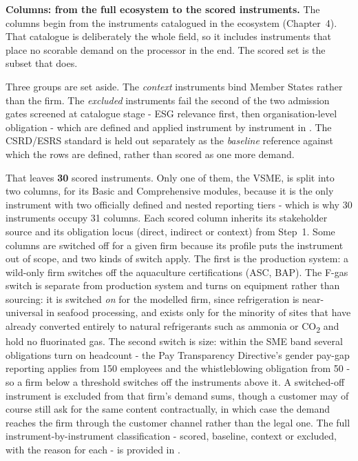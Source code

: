 \textbf{Columns: from the full ecosystem to the scored instruments.} The columns
begin from the instruments catalogued in the ecosystem (Chapter~4). That
catalogue is deliberately the whole field, so it includes instruments that place
no scorable demand on the processor in the end. The scored set is the subset that
does.

Three groups are set aside. The \emph{context} instruments bind Member States
rather than the firm. The \emph{excluded} instruments fail the second of the two
admission gates screened at catalogue stage - ESG relevance first, then
organisation-level obligation - which are defined and applied instrument by
instrument in . The CSRD/ESRS standard is held out separately
as the \emph{baseline} reference against which the rows are defined, rather than
scored as one more demand.

That leaves \textbf{30} scored instruments. Only one of them, the VSME, is split
into two columns, for its Basic and Comprehensive modules, because it is the only
instrument with two officially defined and nested reporting tiers - which is why
30 instruments occupy 31 columns. Each scored column inherits its stakeholder
source and its obligation locus (direct, indirect or context) from Step~1. Some columns are switched off for a given firm because its profile puts
the instrument out of scope, and two kinds of switch apply. The first is the
production system: a wild-only firm switches off the aquaculture certifications
(ASC, BAP). The F-gas switch is separate from production system and turns on
equipment rather than sourcing: it is switched \emph{on} for the modelled firm,
since refrigeration is near-universal in seafood processing, and exists only for
the minority of sites that have already converted entirely to natural
refrigerants such as ammonia or CO\textsubscript{2} and hold no fluorinated gas.
The second switch is size: within the SME band several obligations turn on
headcount - the Pay Transparency Directive's gender pay-gap reporting applies from
150 employees and the whistleblowing obligation from 50 - so a firm below a
threshold switches off the instruments above it. A switched-off instrument is
excluded from that firm's demand sums, though a customer may of course still ask
for the same content contractually, in which case the demand reaches the firm
through the customer channel rather than the legal one. The full
instrument-by-instrument classification - scored, baseline, context or excluded,
with the reason for each - is provided in .

